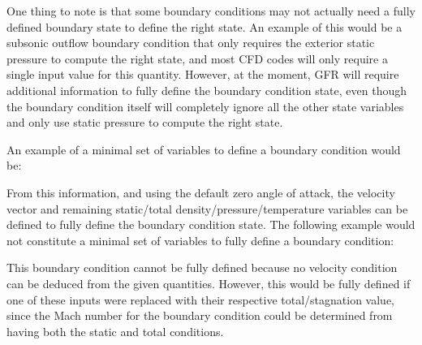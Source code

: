 
One thing to note is that some boundary conditions may not actually need a fully
defined boundary state to define the right state.
%
An example of this would be a subsonic outflow boundary condition that only
requires the exterior static pressure to compute the right state, and most CFD
codes will only require a single input value for this quantity.
%
However, at the moment, GFR will require additional information to fully define
the boundary condition state, even though the boundary condition itself will
completely ignore all the other state variables and only use static pressure to
compute the right state.


An example of a minimal set of variables to define a boundary condition
would be:
%
\begin{InputExample}
  \item[\textcolor{Green}{\checkmark{} Fully defined boundary condition}]
  \item[\BCinptext{Mach}]
  \item[\BCinptext{Temperature}]
  \item[\BCinptext{Total\_Pressure}]
\end{InputExample}
%
From this information, and using the default zero angle of attack, the velocity
vector and remaining static\slash total density\slash pressure\slash temperature
variables can be defined to fully define the boundary condition state.
%
The following example would not constitute a minimal set of variables to fully
define a boundary condition:
%
\begin{InputExample}
  \item[\textcolor{Red}{$\bm{\mathsf{X}}$ Incomplete boundary condition}]
  \item[\BCinptext{Density}]
  \item[\BCinptext{Temperature}]
  \item[\BCinptext{Pressure}]
\end{InputExample}
%
This boundary condition cannot be fully defined because no velocity condition
can be deduced from the given quantities.
%
However, this would be fully defined if one of these inputs were replaced with
their respective total\slash stagnation value, since the Mach number for the
boundary condition could be determined from having both the static and total
conditions.


